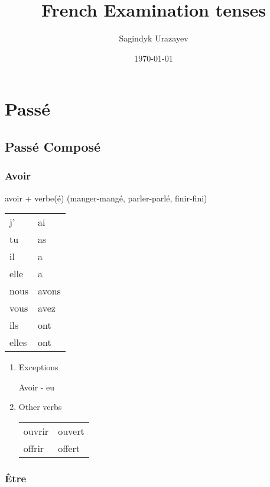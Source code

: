 \documentclass[11pt]{article}
\author{Sagindyk Urazayev}
\date{\today}
\title{French Examination tenses}
\begin{document}
\maketitle
\tableofcontents

\newpage
\section{Passé}
\label{sec-1}
\subsection{Passé Composé}
\label{sec-1-1}

\subsubsection{Avoir}
\label{sec-1-1-1}

avoir + verbe(é) (manger-mangé, parler-parlé, finir-fini)

\begin{center}
\begin{tabular}{ll}
j' & ai\\
tu & as\\
il & a\\
elle & a\\
nous & avons\\
vous & avez\\
ils & ont\\
elles & ont\\
\end{tabular}
\end{center}

\begin{enumerate}
\item Exceptions
\label{sec-1-1-1-1}

Avoir - eu

\item Other verbs
\label{sec-1-1-1-2}

\begin{center}
\begin{tabular}{ll}
ouvrir & ouvert\\
offrir & offert\\
\end{tabular}
\end{center}
\end{enumerate}

\subsubsection{Être}
\label{sec-1-1-2}
\end{document}
